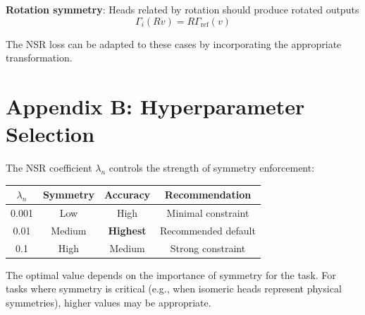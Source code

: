 \documentclass[12pt]{article}
\begin{document}
\textbf{Rotation symmetry}: Heads related by rotation should produce rotated outputs
\begin{equation}
\Gamma_i(R v) = R \Gamma_{\text{ref}}(v)
\end{equation}

The NSR loss can be adapted to these cases by incorporating the appropriate transformation.

\section*{Appendix B: Hyperparameter Selection}

The NSR coefficient $\lambda_n$ controls the strength of symmetry enforcement:

\begin{center}
\begin{tabular}{|c|c|c|c|}
\hline
\textbf{$\lambda_n$} & \textbf{Symmetry} & \textbf{Accuracy} & \textbf{Recommendation} \\
\hline
0.001 & Low & High & Minimal constraint \\
0.01 & Medium & \textbf{Highest} & Recommended default \\
0.1 & High & Medium & Strong constraint \\
\hline
\end{tabular}
\end{center}

The optimal value depends on the importance of symmetry for the task. For tasks where symmetry is critical (e.g., when isomeric heads represent physical symmetries), higher values may be appropriate.
\end{document}
